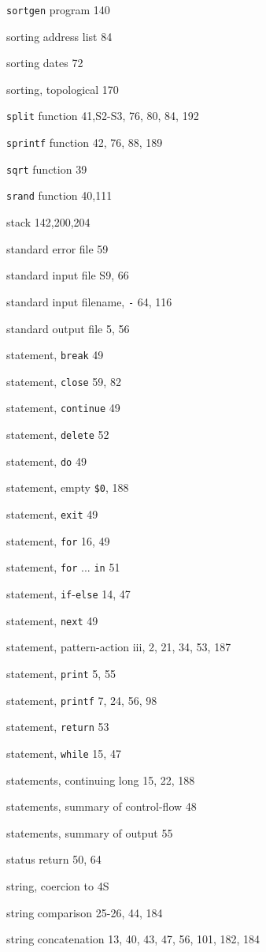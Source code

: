 \begin{multicols}{2}
\verb'sortgen' program 140

sorting address list 84

sorting dates 72

sorting, topological 170

\verb'split' function 41,S2-S3, 76, 80, 84, 192

\verb'sprintf' function 42, 76, 88, 189

\verb'sqrt' function 39

\verb'srand' function 40,111

stack 142,200,204

standard error file 59

standard input file S9, 66

standard input filename, \verb'-' 64, 116

standard output file 5, 56

statement, \verb'break' 49

statement, \verb'close' 59, 82

statement, \verb'continue' 49

statement, \verb'delete' 52

statement, \verb'do' 49

statement, empty \verb'$0', 188

statement, \verb'exit' 49

statement, \verb'for' 16, 49

statement, \verb'for' ... \verb'in' 51

statement, \verb'if'-\verb'else' 14, 47

statement, \verb'next' 49

statement, pattern-action iii, 2, 21, 34, 53, 187

statement, \verb'print' 5, 55

statement, \verb'printf' 7, 24, 56, 98

statement, \verb'return' 53

statement, \verb'while' 15, 47

statements, continuing long 15, 22, 188

statements, summary of control-flow 48

statements, summary of output 55

status return 50, 64

string, coercion to 4S

string comparison 25-26, 44, 184

string concatenation 13, 40, 43,  47, 56, 101, 182, 184


\end{multicols}
